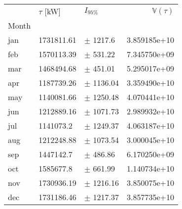 \begin{tabular}{lllr}
\toprule
{} & $\tau$ [kW] &     $I_{95\%}$ &  $\mathbb{V}(\tau)$ \\
Month &             &                &                     \\
\midrule
jan   &  1731811.61 &   $\pm$ 1217.6 &        3.859185e+10 \\
feb   &  1570113.39 &   $\pm$ 531.22 &        7.345750e+09 \\
mar   &  1468494.68 &   $\pm$ 451.01 &        5.295017e+09 \\
apr   &  1187739.26 &  $\pm$ 1136.04 &        3.359490e+10 \\
may   &  1140081.66 &  $\pm$ 1250.48 &        4.070441e+10 \\
jun   &  1212889.16 &  $\pm$ 1071.73 &        2.989932e+10 \\
jul   &   1141073.2 &  $\pm$ 1249.37 &        4.063187e+10 \\
aug   &  1212248.88 &  $\pm$ 1073.54 &        3.000045e+10 \\
sep   &   1447142.7 &   $\pm$ 486.86 &        6.170250e+09 \\
oct   &   1585677.8 &   $\pm$ 661.99 &        1.140734e+10 \\
nov   &  1730936.19 &  $\pm$ 1216.16 &        3.850075e+10 \\
dec   &  1731186.46 &  $\pm$ 1217.37 &        3.857735e+10 \\
\bottomrule
\end{tabular}
